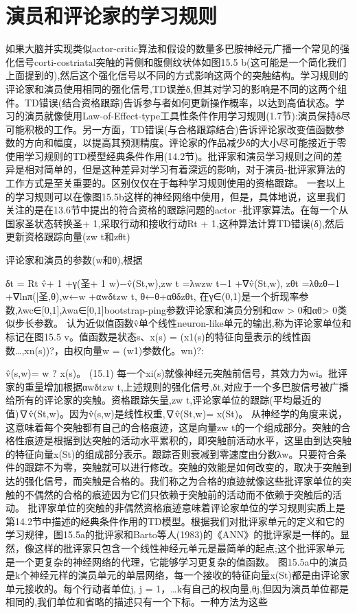\section{演员和评论家的学习规则}

如果大脑并实现类似actor-critic算法和假设的数量多巴胺神经元广播一个常见的强化信号corti-costriatal突触的背侧和腹侧纹状体如图15.5 b(这可能是一个简化我们上面提到的),然后这个强化信号以不同的方式影响这两个的突触结构。学习规则的评论家和演员使用相同的强化信号,TD误差δ,但其对学习的影响是不同的这两个组件。TD错误(结合资格跟踪)告诉参与者如何更新操作概率，以达到高值状态。学习的演员就像使用Law-of-Effect-type工具性条件作用学习规则(1.7节):演员保持δ尽可能积极的工作。另一方面，TD错误(与合格跟踪结合)告诉评论家改变值函数参数的方向和幅度，以提高其预测精度。评论家的作品减少δ的大小尽可能接近于零使用学习规则的TD模型经典条件作用(14.2节)。批评家和演员学习规则之间的差异是相对简单的，但是这种差异对学习有着深远的影响，对于演员-批评家算法的工作方式是至关重要的。区别仅仅在于每种学习规则使用的资格跟踪。
一套以上的学习规则可以在像图15.5b这样的神经网络中使用，但是，具体地说，这里我们关注的是在13.6节中提出的符合资格的跟踪问题的actor -批评家算法。在每一个从国家圣状态转换圣+ 1,采取行动和接收行动Rt + 1,这种算法计算TD错误(δ),然后更新资格跟踪向量(zw t和zθt)

评论家和演员的参数(w和θ),根据

δt = Rt v̂+ 1 +γ(圣+ 1 w)−v̂(St,w),zw t =λwzw t−1 +∇v̂(St,w),
zθt =λθzθ−1 +∇lnπ(|圣,θ),w←w +αwδtzw t,
θ←θ+αθδzθt,
在γ∈(0,1)是一个折现率参数,λwc∈[0,1],λwa∈[0,1]bootstrap-ping参数评论家和演员分别和αw > 0和αθ> 0类似步长参数。
认为近似值函数v̂单个线性neuron-like单元的输出,称为评论家单位和标记在图15.5 v。值函数是状态s、x(s) = (x1(s)的特征向量表示的线性函数…,xn(s))?，由权向量w = (w1)参数化。wn)?:

v̂(s,w)= w ? x(s)。 					(15.1)
每一个xi(s)就像神经元突触前信号，其效力为wi。批评家的重量增加根据αwδtzw t,上述规则的强化信号,δt,对应于一个多巴胺信号被广播给所有的评论家的突触。资格跟踪矢量,zw t,评论家单位的跟踪(平均最近的值)∇v̂(St,w)。因为v̂(s,w)是线性权重,∇v̂(St,w)= x(St)。
从神经学的角度来说，这意味着每个突触都有自己的合格痕迹，这是向量zw t的一个组成部分。突触的合格性痕迹是根据到达突触的活动水平累积的，即突触前活动水平，这里由到达突触的特征向量x(St)的组成部分表示。跟踪否则衰减到零速度由分数λw。只要符合条件的跟踪不为零，突触就可以进行修改。突触的效能是如何改变的，取决于突触到达的强化信号，而突触是合格的。我们称之为合格的痕迹就像这些批评家单位的突触的不偶然的合格的痕迹因为它们只依赖于突触前的活动而不依赖于突触后的活动。
批评家单位的突触的非偶然资格痕迹意味着评论家单位的学习规则实质上是第14.2节中描述的经典条件作用的TD模型。根据我们对批评家单元的定义和它的学习规律，图15.5a的批评家和Barto等人(1983)的《ANN》的批评家是一样的。显然，像这样的批评家只包含一个线性神经元单元是最简单的起点;这个批评家单元是一个更复杂的神经网络的代理，它能够学习更复杂的值函数。
图15.5a中的演员是k个神经元样的演员单元的单层网络，每一个接收的特征向量x(St)都是由评论家单元接收的。每个行动者单位j, j = 1，…k有自己的权向量,θj,但因为演员单位都是相同的,我们单位和省略的描述只有一个下标。一种方法为这些

